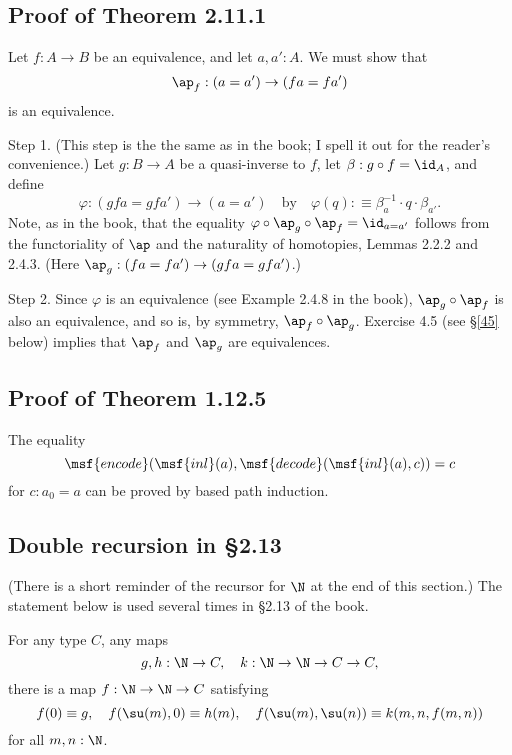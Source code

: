\documentclass[12pt]{article}
\begin{document}

\subsection{Proof of Theorem 2.11.1}\label{2111}

Let $f:A\to B$ be an equivalence, and let $a,a':A$. We must show that 
$$
\ap_f:(a=a')\to (fa=fa')
$$ 
is an equivalence.

Step 1. (This step is the the same as in the book; I spell it out for the reader's convenience.) Let $g:B\to A$ be a quasi-inverse to $f$, let $\beta:g\circ f=\id_A$, and define 
$$
\varphi:(gfa=gfa')\to(a=a')\quad\text{by}\quad\varphi(q):\equiv\beta_a^{-1}\cdot q\cdot\beta_{a'}.
$$ 
Note, as in the book, that the equality $\varphi\circ\ap_g\circ\ap_f=\id_{a=a'}$ follows from the functoriality of $\ap$ and the naturality of homotopies, Lemmas 2.2.2 and 2.4.3. (Here $\ap_g:(fa=fa')\to (gfa=gfa')$.)

Step 2. Since $\varphi$ is an equivalence (see Example 2.4.8 in the book), $\ap_g\circ\ap_f$ is also an equivalence, and so is, by symmetry, $\ap_f\circ\ap_g$. Exercise 4.5 (see \S\ref{45} below) implies that $\ap_f$ and $\ap_g$ are equivalences.



\subsection{Proof of Theorem 1.12.5}

The equality 
$$
\msf{encode}(\msf{inl}(a),\msf{decode}(\msf{inl}(a),c))=c
$$ 
for $c:a_0=a$ can be proved by based path induction.


\subsection{Double recursion in \S2.13}

(There is a short reminder of the recursor for $\N$ at the end of this section.) The statement below is used several times in \S2.13 of the book.

For any type $C$, any maps 
$$
g,h:\N\to C,\quad k:\N\to\N\to C\to C,
$$ 
there is a map $f:\N\to\N\to C$ satisfying 
$$
f(0)\equiv g,\quad f(\su(m),0)\equiv h(m),\quad f(\su(m),\su(n))\equiv k(m,n,f(m,n))
$$ 
for all $m,n:\N$.
\end{document}
